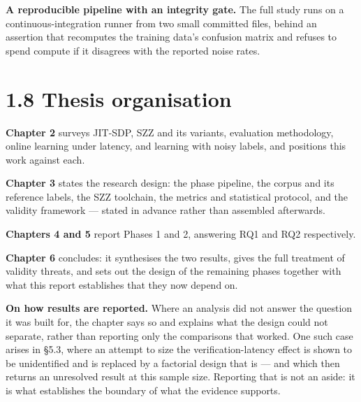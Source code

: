 \textbf{A reproducible pipeline with an integrity gate.} The full study
runs on a continuous-integration runner from two small committed files,
behind an assertion that recomputes the training data's confusion matrix
and refuses to spend compute if it disagrees with the reported noise
rates.

\section{1.8 Thesis organisation}\label{thesis-organisation}

\textbf{Chapter 2} surveys JIT-SDP, SZZ and its variants, evaluation
methodology, online learning under latency, and learning with noisy
labels, and positions this work against each.

\textbf{Chapter 3} states the research design: the phase pipeline, the
corpus and its reference labels, the SZZ toolchain, the metrics and
statistical protocol, and the validity framework --- stated in advance
rather than assembled afterwards.

\textbf{Chapters 4 and 5} report Phases 1 and 2, answering RQ1 and RQ2
respectively.

\textbf{Chapter 6} concludes: it synthesises the two results, gives the
full treatment of validity threats, and sets out the design of the
remaining phases together with what this report establishes that they
now depend on.

\textbf{On how results are reported.} Where an analysis did not answer
the question it was built for, the chapter says so and explains what the
design could not separate, rather than reporting only the comparisons
that worked. One such case arises in \S{}5.3, where an attempt to size the
verification-latency effect is shown to be unidentified and is replaced
by a factorial design that is --- and which then returns an unresolved
result at this sample size. Reporting that is not an aside: it is what
establishes the boundary of what the evidence supports.
